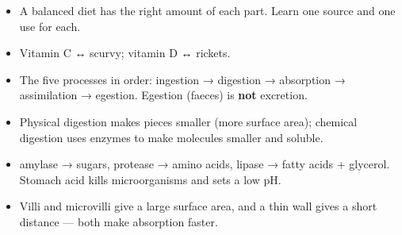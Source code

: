 \documentclass[11pt]{article}
\begin{document}
\begin{itemize}
\item A balanced diet has the right amount of each part. Learn one source and one use for each.

\item Vitamin C ↔ scurvy; vitamin D ↔ rickets.

\item The five processes in order: ingestion → digestion → absorption → assimilation → egestion. Egestion (faeces) is \textbf{not} excretion.

\item Physical digestion makes pieces smaller (more surface area); chemical digestion uses enzymes to make molecules smaller and soluble.

\item amylase → sugars, protease → amino acids, lipase → fatty acids + glycerol. Stomach acid kills microorganisms and sets a low pH.

\item Villi and microvilli give a large surface area, and a thin wall gives a short distance — both make absorption faster.

\end{itemize}
\end{document}
